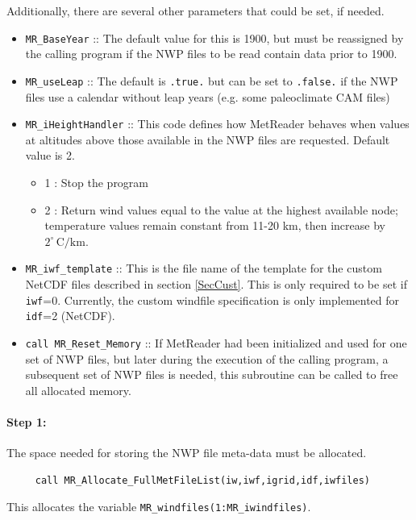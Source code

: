 \documentclass[11pt]{article}   %
\begin{document}
Additionally, there are several other parameters that could be set, if needed.
\begin{itemize}
\item \texttt{MR\_BaseYear} :: The default value for this is 1900, but must be
reassigned by the calling program if the NWP files to be read contain data prior to 1900.
\item \texttt{MR\_useLeap} :: The default is \texttt{.true.} but can be set to \texttt{.false.}
if the NWP files use a calendar without leap years (e.g. some paleoclimate CAM files)
\item \texttt{MR\_iHeightHandler} :: This code defines how MetReader behaves when values at
altitudes above those available in the NWP files are requested.  Default value is 2.
 \begin{itemize}
 \item   1 : Stop the program
 \item   2 : Return wind values equal to the value at the highest available node; temperature
values remain constant from 11-20 km, then increase by $2^{\circ} \, \mathrm{C/km}$.
 \end{itemize}
\item \texttt{MR\_iwf\_template} :: This is the file name of the template for the
custom NetCDF files described in section \ref{SecCust}.  This is only required to be set
if \texttt{iwf}=0.  Currently, the custom windfile specification is only implemented for
\texttt{idf}=2 (NetCDF).
\item \texttt{call MR\_Reset\_Memory} :: If MetReader had been initialized and used for
one set of NWP files, but later during the execution of the calling program, a subsequent
set of NWP files is needed, this subroutine can be called to free all allocated memory.
\end{itemize}

\paragraph{Step 1:} The space needed for storing the NWP file meta-data must be allocated.
\begin{verbatim}
     call MR_Allocate_FullMetFileList(iw,iwf,igrid,idf,iwfiles)
\end{verbatim}
This allocates the variable \texttt{MR\_windfiles(1:MR\_iwindfiles)}.
\end{document}

